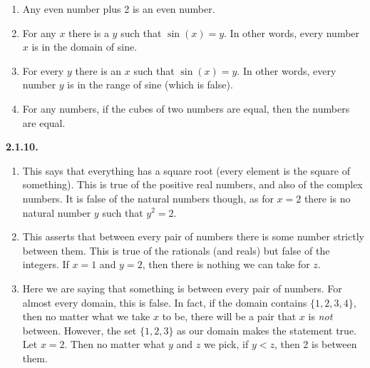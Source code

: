 \documentclass[12pt,]{book}
\theoremstyle{plain}
\theoremstyle{definition}
\theoremstyle{definition}
\theoremstyle{definition}
\numberwithin{equation}{chapter}
\newcommand{\lt}{<}
\begin{document}
\begin{enumerate}[label=(\alph*)]
\item\hypertarget{li-603}{}\hypertarget{p-1187}{}%
Any even number plus 2 is an even number.%
\item\hypertarget{li-604}{}\hypertarget{p-1188}{}%
For any \(x\) there is a \(y\) such that \(\sin(x) = y\). In other words, every number \(x\) is in the domain of sine.%
\item\hypertarget{li-605}{}\hypertarget{p-1189}{}%
For every \(y\) there is an \(x\) such that \(\sin(x) = y\). In other words, every number \(y\) is in the range of sine (which is false).%
\item\hypertarget{li-606}{}\hypertarget{p-1190}{}%
For any numbers, if the cubes of two numbers are equal, then the numbers are equal.%
\end{enumerate}
%
\par\smallskip
\noindent\textbf{2.1.10.} \hypertarget{p-1194}{}%
\leavevmode%
\begin{enumerate}[label=(\alph*)]
\item\hypertarget{li-610}{}\hypertarget{p-1195}{}%
This says that everything has a square root (every element is the square of something). This is true of the positive real numbers, and also of the complex numbers. It is false of the natural numbers though, as for \(x = 2\) there is no natural number \(y\) such that \(y^2 = 2\).%
\item\hypertarget{li-611}{}\hypertarget{p-1196}{}%
This asserts that between every pair of numbers there is some number strictly between them. This is true of the rationals (and reals) but false of the integers. If \(x = 1\) and \(y = 2\), then there is nothing we can take for \(z\).%
\item\hypertarget{li-612}{}\hypertarget{p-1197}{}%
Here we are saying that something is between every pair of numbers. For almost every domain, this is false. In fact, if the domain contains \(\{1,2,3, 4\}\), then no matter what we take \(x\) to be, there will be a pair that \(x\) is \emph{not} between. However, the set \(\{1,2,3\}\) as our domain makes the statement true. Let \(x = 2\). Then no matter what \(y\) and \(z\) we pick, if \(y \lt  z\), then 2 is between them.%
\end{enumerate}
%
\par\smallskip
\end{document}
